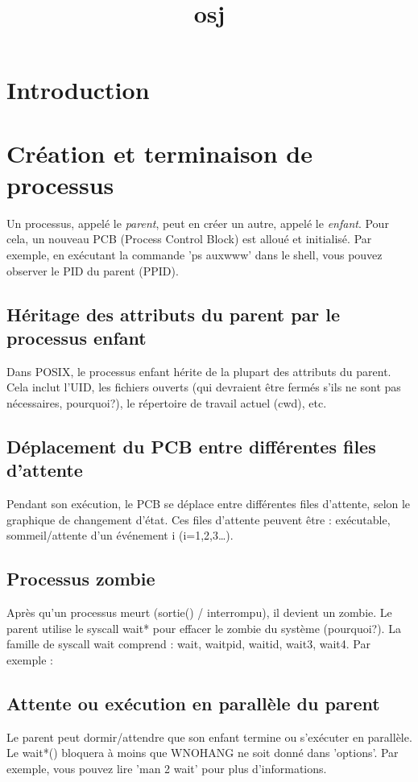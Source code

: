 \documentclass[12pt]{report}
\title{osj}
\author{}
\begin{document}
\maketitle
\tableofcontents
\newpage

\section{Introduction}
  \section{Création et terminaison de processus}    Un processus, appelé le \textit{parent}, peut en créer un autre, appelé le \textit{enfant}. Pour cela, un nouveau PCB (Process Control Block) est alloué et initialisé. Par exemple, en exécutant la commande 'ps auxwww' dans le shell, vous pouvez observer le PID du parent (PPID).    \subsection{Héritage des attributs du parent par le processus enfant}    Dans POSIX, le processus enfant hérite de la plupart des attributs du parent. Cela inclut l'UID, les fichiers ouverts (qui devraient être fermés s'ils ne sont pas nécessaires, pourquoi?), le répertoire de travail actuel (cwd), etc.    \subsection{Déplacement du PCB entre différentes files d'attente}    Pendant son exécution, le PCB se déplace entre différentes files d'attente, selon le graphique de changement d'état. Ces files d'attente peuvent être : exécutable, sommeil/attente d'un événement i (i=1,2,3…).    \subsection{Processus zombie}    Après qu'un processus meurt (sortie() / interrompu), il devient un zombie. Le parent utilise le syscall wait* pour effacer le zombie du système (pourquoi?). La famille de syscall wait comprend : wait, waitpid, waitid, wait3, wait4. Par exemple :    \subsection{Attente ou exécution en parallèle du parent}    Le parent peut dormir/attendre que son enfant termine ou s'exécuter en parallèle. Le wait*() bloquera à moins que WNOHANG ne soit donné dans 'options'. Par exemple, vous pouvez lire 'man 2 wait' pour plus d'informations.  
\end{document}
